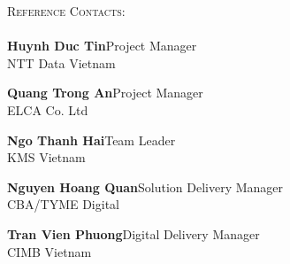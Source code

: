 \documentclass[a4paper]{article}
\newcommand{\lineunder} {
    \vspace*{-8pt} \\
    \hspace*{-18pt} \hrulefill \\
}
\newcommand{\header} [1] {
    {\hspace*{-18pt}\vspace*{6pt} \textsc{#1}}
    \vspace*{-6pt} \lineunder
}
\begin{document}
\header{Reference Contacts:}

\textbf{Huynh Duc Tin}\hfill Project Manager\\
NTT Data Vietnam \hfill %
\vspace{2mm}

\textbf{Quang Trong An}\hfill Project Manager\\
ELCA Co. Ltd \hfill %
\vspace{2mm}

\textbf{Ngo Thanh Hai}\hfill Team Leader\\
KMS Vietnam \hfill %
\vspace{2mm}

\textbf{Nguyen Hoang Quan}\hfill Solution Delivery Manager\\
CBA/TYME Digital \hfill %
\vspace{2mm}

\textbf{Tran Vien Phuong}\hfill Digital Delivery Manager\\
CIMB Vietnam \hfill %

\end{document}
